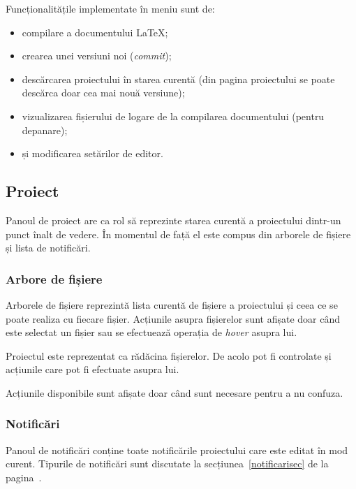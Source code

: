 \documentclass[a4wide,12pt]{report}
\newcommand{\eng}[1]{\emph{#1}} %
\begin{document}
Funcționalitățile implementate în meniu sunt de:

\begin{itemize}

\item compilare a documentului \LaTeX{};

\item crearea unei versiuni noi (\eng{commit});

\item descărcarea proiectului în starea curentă (din pagina proiectului se
poate descărca doar cea mai nouă versiune);

\item vizualizarea fișierului de logare de la compilarea documentului (pentru
depanare);

\item și modificarea setărilor de editor.

\end{itemize}

\subsection{Proiect}

Panoul de proiect are ca rol să reprezinte starea curentă a proiectului dintr-un
punct înalt de vedere. În momentul de față el este compus din arborele de
fișiere și lista de notificări.

\subsubsection{Arbore de fișiere}

Arborele de fișiere reprezintă lista curentă de fișiere a proiectului și ceea ce
se poate realiza cu fiecare fișier. Acțiunile asupra fișierelor sunt afișate
doar când este selectat un fișier sau se efectuează operația de \eng{hover}
asupra lui.

Proiectul este reprezentat ca rădăcina fișierelor. De acolo pot fi controlate și
acțiunile care pot fi efectuate asupra lui.

Acțiunile disponibile sunt afișate doar când sunt necesare pentru a nu confuza.

\subsubsection{Notificări}

Panoul de notificări conține toate notificările proiectului care este editat în
mod curent. Tipurile de notificări sunt discutate la
secțiunea~\ref{notificarisec} de la pagina~\pageref{notificarisec}.
\end{document}
